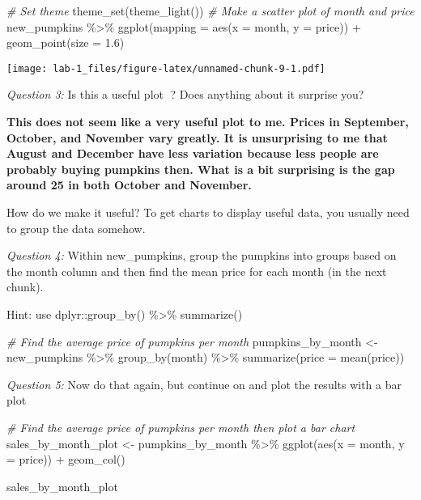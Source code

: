 \documentclass[
]{article}
\newenvironment{Shaded}{\begin{snugshade}}{\end{snugshade}}
\newcommand{\AttributeTok}[1]{\textcolor[rgb]{0.77,0.63,0.00}{#1}}
\newcommand{\CommentTok}[1]{\textcolor[rgb]{0.56,0.35,0.01}{\textit{#1}}}
\newcommand{\FloatTok}[1]{\textcolor[rgb]{0.00,0.00,0.81}{#1}}
\newcommand{\FunctionTok}[1]{\textcolor[rgb]{0.00,0.00,0.00}{#1}}
\newcommand{\NormalTok}[1]{#1}
\newcommand{\OtherTok}[1]{\textcolor[rgb]{0.56,0.35,0.01}{#1}}
\newcommand{\SpecialCharTok}[1]{\textcolor[rgb]{0.00,0.00,0.00}{#1}}
\begin{document}
\begin{Shaded}
\begin{Highlighting}[]
\CommentTok{\# Set theme}
\FunctionTok{theme\_set}\NormalTok{(}\FunctionTok{theme\_light}\NormalTok{())}
\CommentTok{\# Make a scatter plot of month and price}
\NormalTok{new\_pumpkins }\SpecialCharTok{\%\textgreater{}\%} 
  \FunctionTok{ggplot}\NormalTok{(}\AttributeTok{mapping =} \FunctionTok{aes}\NormalTok{(}\AttributeTok{x =}\NormalTok{ month, }\AttributeTok{y =}\NormalTok{ price)) }\SpecialCharTok{+}
  \FunctionTok{geom\_point}\NormalTok{(}\AttributeTok{size =} \FloatTok{1.6}\NormalTok{)}
\end{Highlighting}
\end{Shaded}

\texttt{[image: lab-1\_files/figure-latex/unnamed-chunk-9-1.pdf]}

\emph{Question 3:} Is this a useful plot 🤷? Does anything about it
surprise you?

\textbf{This does not seem like a very useful plot to me. Prices in
September, October, and November vary greatly. It is unsurprising to me
that August and December have less variation because less people are
probably buying pumpkins then. What is a bit surprising is the gap
around 25 in both October and November.}

How do we make it useful? To get charts to display useful data, you
usually need to group the data somehow.

\emph{Question 4:} Within new\_pumpkins, group the pumpkins into groups
based on the month column and then find the mean price for each month
(in the next chunk).

Hint: use dplyr::group\_by() \%\textgreater\% summarize()

\begin{Shaded}
\begin{Highlighting}[]
\CommentTok{\# Find the average price of pumpkins per month}
\NormalTok{pumpkins\_by\_month }\OtherTok{\textless{}{-}}\NormalTok{ new\_pumpkins }\SpecialCharTok{\%\textgreater{}\%} 
  \FunctionTok{group\_by}\NormalTok{(month) }\SpecialCharTok{\%\textgreater{}\%} 
  \FunctionTok{summarize}\NormalTok{(}\AttributeTok{price =} \FunctionTok{mean}\NormalTok{(price))}
\end{Highlighting}
\end{Shaded}

\emph{Question 5:} Now do that again, but continue on and plot the
results with a bar plot

\begin{Shaded}
\begin{Highlighting}[]
\CommentTok{\# Find the average price of pumpkins per month then plot a bar chart}
\NormalTok{sales\_by\_month\_plot }\OtherTok{\textless{}{-}}\NormalTok{ pumpkins\_by\_month }\SpecialCharTok{\%\textgreater{}\%} 
  \FunctionTok{ggplot}\NormalTok{(}\FunctionTok{aes}\NormalTok{(}\AttributeTok{x =}\NormalTok{ month, }\AttributeTok{y =}\NormalTok{ price)) }\SpecialCharTok{+}
  \FunctionTok{geom\_col}\NormalTok{()}

\NormalTok{sales\_by\_month\_plot}
\end{Highlighting}
\end{Shaded}
\end{document}
